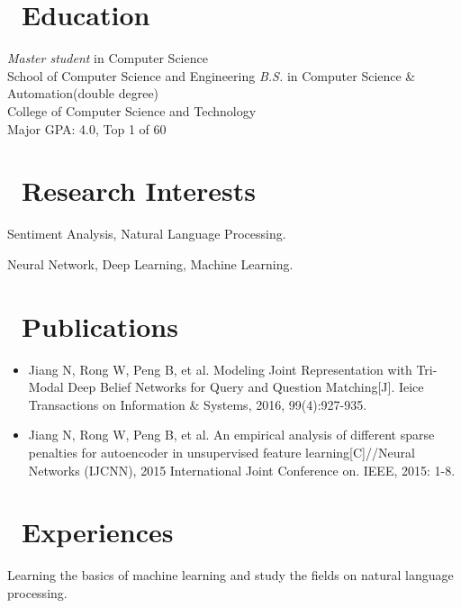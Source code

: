 \documentclass{resume}
\begin{document}



\section{\faGraduationCap\ Education}
\textit{Master student} in Computer Science \\
School of Computer Science and Engineering
\textit{B.S.} in Computer Science \& Automation(double degree)\\
College of Computer Science and Technology\\
Major GPA: 4.0, Top 1 of 60

\section{\faLightbulbO\ Research Interests}
Sentiment Analysis, Natural Language Processing.

Neural Network, Deep Learning, Machine Learning.

\section{\faBook\ Publications}
\begin{itemize}[parsep=0.5ex]
\item Jiang N, Rong W, Peng B, et al. Modeling Joint Representation with Tri-Modal Deep Belief Networks for Query and Question Matching[J]. Ieice Transactions on Information \& Systems, 2016, 99(4):927-935.

\item Jiang N, Rong W, Peng B, et al. An empirical analysis of different sparse penalties for autoencoder in unsupervised feature learning[C]//Neural Networks (IJCNN), 2015 International Joint Conference on. IEEE, 2015: 1-8.
\end{itemize}
\section{\faUsers\ Experiences}
Learning the basics of machine learning and study the fields on natural language processing.
\end{document}
